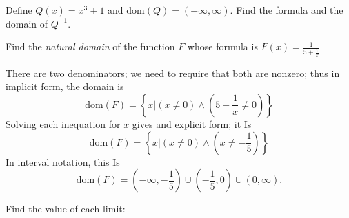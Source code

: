 \documentclass[12pt, fleqn]{exam}
\newcommand{\dom}{\mbox{dom}}
\begin{document}
\begin{questions}
\question   Define $Q(x) = x^3 + 1$ and $\dom(Q) = (-\infty,\infty)$. Find the formula
and the domain of $Q^{-1}$. 
\begin{solution} 
\end{solution}
    \question   Find the \emph{natural domain} of the function $F$ whose
formula is $F(x) = \frac{1}{5+ \frac{1}{x}}$
\begin{solution}%
    There are two denominators; we need to require that both are nonzero; thus
    in implicit form, the domain is
    \[
        \dom(F) = \left \{ x | (x \neq 0) \land (5+ \frac{1}{x} \neq 0) \right \}
    \]
    Solving each inequation for $x$ gives and explicit form; it Is
    \[
        \dom(F) = \left \{ x | (x \neq 0) \land (x  \neq -\frac{1}{5}) \right \}
    \]
    In interval notation, this Is
    \[   \dom(F) = (-\infty, -\frac{1}{5}) \cup (-\frac{1}{5},0) \cup
          (0, \infty).
        \]
\end{solution}



\question Find the value of each limit:

\end{questions}
\end{document}
